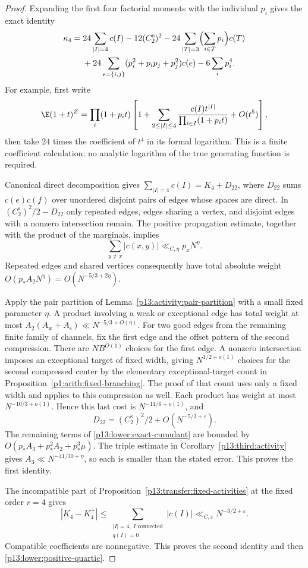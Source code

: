 \begin{proof}
Expanding the first four factorial moments with the individual $p_i$
gives the exact identity
\begin{align}
 \kappa_4={}&24\sum_{|I|=4}c(I)-12(C_2^{\mathrm s})^2
 -24\sum_{|T|=3}\Bigl(\sum_{i\in T}p_i\Bigr)c(T)\notag\\
 &+24\sum_{e=\{i,j\}}(p_i^2+p_ip_j+p_j^2)c(e)
 -6\sum_i p_i^4.
 \label{p13:lower:exact-cumulant}
\end{align}
For example, first write
\[
 \E(1+t)^Z=\prod_i(1+p_it)
 \left[1+\sum_{2\leq|I|\leq4}
       \frac{c(I)t^{|I|}}{\prod_{i\in I}(1+p_it)}+O(t^5)\right],
\]
then take $24$ times the coefficient of $t^4$ in its formal logarithm.
This is a finite coefficient calculation; no analytic logarithm of the
true generating function is required.

Canonical direct decomposition gives
$\sum_{|I|=4}c(I)=K_4+D_{22}$, where $D_{22}$ sums
$c(e)c(f)$ over unordered disjoint pairs of edges whose spaces are direct.
In $(C_2^{\mathrm s})^2/2-D_{22}$ only repeated edges, edges sharing a
vertex, and disjoint edges with a nonzero intersection remain.
The positive propagation estimate, together with the product of the
marginals, implies
\[
 \sum_{y\ne x}|c(x,y)|\ll_{C,\eta}p_xN^\eta.
\]
Repeated edges and shared vertices consequently have total absolute
weight $O(p_*A_2N^\eta)=O(N^{-5/3+2\eta})$.

Apply the pair partition of Lemma~\ref{p13:activity:pair-partition} with
a small fixed parameter $\eta$. A product involving a weak or exceptional
edge has total weight at most
$A_2(A_{\mathrm w}+A_{\mathrm s})
\ll N^{-5/3+O(\eta)}$.
For two good edges from the remaining finite family of channels, fix the
first edge and the offset pattern of the second compression. There are
$NB^{O(1)}$ choices for the first edge. A nonzero intersection imposes
an exceptional target of fixed width, giving $N^{1/2+o(1)}$ choices for
the second compressed center by the elementary exceptional-target count
in Proposition~\ref{p1:arith:fixed-branching}. The proof of that count
uses only a fixed width and applies to this compression as well.
Each product has weight at most $N^{-10/3+o(1)}$. Hence this last cost is
$N^{-11/6+o(1)}$, and
\[
 D_{22}=(C_2^{\mathrm s})^2/2+O(N^{-5/3+\varepsilon}).
\]
The remaining terms of \eqref{p13:lower:exact-cumulant} are bounded by
$O(p_*A_3+p_*^2A_2+p_*^3\mu)$.
The triple estimate in Corollary~\ref{p13:third:activity} gives
$A_3\ll N^{-41/30+\eta}$, so each is smaller than the stated error.
This proves the first identity.

The incompatible part of Proposition~\ref{p13:transfer:fixed-activities}
at the fixed order \(r=4\) gives
\[
 |K_4-K_4^+|
 \le\sum_{\substack{|I|=4,\ I\text{ connected}\\q(I)=0}}|c(I)|
 \ll_{C,\varepsilon}N^{-3/2+\varepsilon}.
\]
Compatible coefficients are nonnegative. This proves the second identity
and then \eqref{p13:lower:positive-quartic}.
\end{proof}


